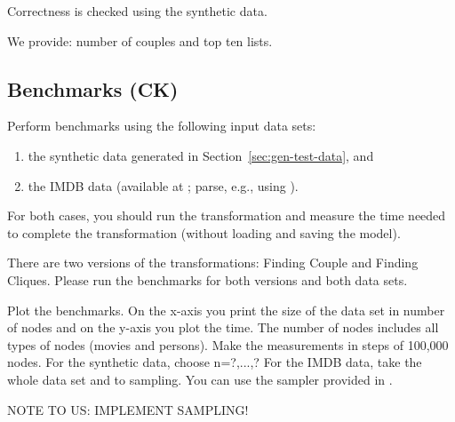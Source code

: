 \documentclass[a4paper]{article}
\begin{document}
Correctness is checked using the synthetic data.

We provide: number of couples and top ten lists.

\subsection{Benchmarks (CK)}

Perform benchmarks using the following input data sets:
\begin{enumerate}
\item the synthetic data generated in Section~\ref{sec:gen-test-data}, and 
\item the IMDB data (available at \cite{IMDBDATA}; parse, e.g., using \cite{IMDB2EMF}).
\end{enumerate}
For both cases, you should run the transformation and measure 
the time needed to complete the transformation (without loading 
and saving the model).

There are two versions of the transformations: Finding Couple and Finding Cliques.
Please run the benchmarks for both versions and both data sets.


Plot the benchmarks. On the x-axis you print the size of the data set
in number of nodes and on the y-axis you plot the time. The number of nodes
includes all types of nodes (movies and persons). Make the measurements in
steps of 100,000 nodes. For the synthetic data, choose n=?,...,?
For the IMDB data, take the whole data set and to sampling. You can use
the sampler provided in \cite{IMDB2EMF}. 

NOTE TO US: IMPLEMENT SAMPLING!





\end{document}
